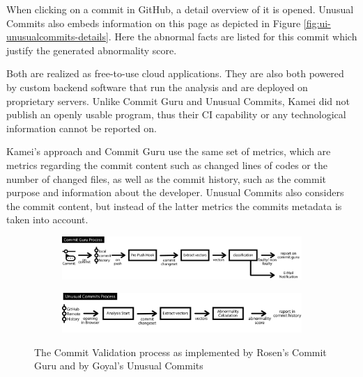 When clicking on a commit in GitHub, a detail overview of it is opened. Unusual Commits also embeds information on this page as depicted in Figure \ref{fig:ui-unusualcommits-details}. Here the abnormal facts are listed for this commit which justify the generated abnormality score.

Both are realized as free-to-use cloud applications. They are also both powered by custom backend software that run the analysis and are deployed on proprietary servers. %
Unlike Commit Guru and Unusual Commits, Kamei did not publish an openly usable program, thus their CI capability or any technological information cannot be reported on.

Kamei's approach and Commit Guru use the same set of metrics, which are metrics regarding the commit content such as changed lines of codes or the number of changed files, as well as the commit history, such as the commit purpose and information about the developer. Unusual Commits also considers the commit content, but instead of the latter metrics the commits metadata is taken into account.

\begin{figure}[t]
	\centering
	
	\begin{subfigure}[t]{\textwidth}
		\includegraphics[width=\textwidth]{images/commitvalidation-process/commitguruprocess-pdf}
		\label{fig:cvprocess-commitguru}
	\end{subfigure}
	
	\begin{subfigure}[t]{\textwidth}
		\includegraphics[width=\textwidth]{images/commitvalidation-process/unusualcommitsprocess-pdf}
		\label{fig:cvprocess-unusual}
	\end{subfigure}
	\caption{The Commit Validation process as implemented by Rosen's Commit Guru \cite{Rosen2015} and by Goyal's Unusual Commits \cite{Goyal2017}}
	\label{fig:cvprocess-guru-unusual}
\end{figure}

